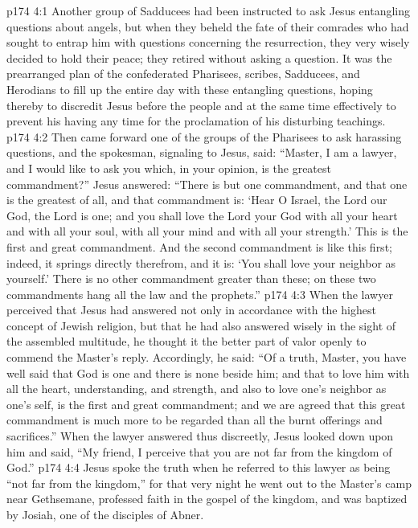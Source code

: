 \vs p174 4:1 Another group of Sadducees had been instructed to ask Jesus entangling questions about angels, but when they beheld the fate of their comrades who had sought to entrap him with questions concerning the resurrection, they very wisely decided to hold their peace; they retired without asking a question. It was the prearranged plan of the confederated Pharisees, scribes, Sadducees, and Herodians to fill up the entire day with these entangling questions, hoping thereby to discredit Jesus before the people and at the same time effectively to prevent his having any time for the proclamation of his disturbing teachings.
\vs p174 4:2 Then came forward one of the groups of the Pharisees to ask harassing questions, and the spokesman, signaling to Jesus, said: “Master, I am a lawyer, and I would like to ask you which, in your opinion, is the greatest commandment?” Jesus answered: \textcolor{ubdarkred}{“There is but one commandment, and that one is the greatest of all, and that commandment is: ‘Hear O Israel, the Lord our God, the Lord is one; and you shall love the Lord your God with all your heart and with all your soul, with all your mind and with all your strength.’ This is the first and great commandment. And the second commandment is like this first; indeed, it springs directly therefrom, and it is: ‘You shall love your neighbor as yourself.’ There is no other commandment greater than these; on these two commandments hang all the law and the prophets.”}
\vs p174 4:3 When the lawyer perceived that Jesus had answered not only in accordance with the highest concept of Jewish religion, but that he had also answered wisely in the sight of the assembled multitude, he thought it the better part of valor openly to commend the Master’s reply. Accordingly, he said: “Of a truth, Master, you have well said that God is one and there is none beside him; and that to love him with all the heart, understanding, and strength, and also to love one’s neighbor as one’s self, is the first and great commandment; and we are agreed that this great commandment is much more to be regarded than all the burnt offerings and sacrifices.” When the lawyer answered thus discreetly, Jesus looked down upon him and said, \textcolor{ubdarkred}{“My friend, I perceive that you are not far from the kingdom of God.”}
\pc \vs p174 4:4 Jesus spoke the truth when he referred to this lawyer as being \textcolor{ubdarkred}{“not far from the kingdom,”} for that very night he went out to the Master’s camp near Gethsemane, professed faith in the gospel of the kingdom, and was baptized by Josiah, one of the disciples of Abner.
